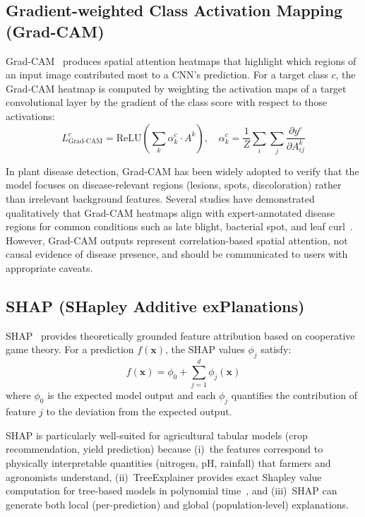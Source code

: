 \documentclass[journal]{IEEEtran}
\begin{document}
\subsection{Gradient-weighted Class Activation Mapping (Grad-CAM)}

Grad-CAM~\cite{selvaraju2017grad} produces spatial attention heatmaps that highlight which regions of an input image contributed most to a CNN's prediction. For a target class $c$, the Grad-CAM heatmap is computed by weighting the activation maps of a target convolutional layer by the gradient of the class score with respect to those activations:
\begin{equation}
  L_{\text{Grad-CAM}}^{c} = \text{ReLU}\!\left(\sum_{k} \alpha_{k}^{c} \cdot A^{k}\right), \quad
  \alpha_{k}^{c} = \frac{1}{Z} \sum_{i} \sum_{j} \frac{\partial y^{c}}{\partial A_{ij}^{k}}
\end{equation}

In plant disease detection, Grad-CAM has been widely adopted to verify that the model focuses on disease-relevant regions (lesions, spots, discoloration) rather than irrelevant background features. Several studies have demonstrated qualitatively that Grad-CAM heatmaps align with expert-annotated disease regions for common conditions such as late blight, bacterial spot, and leaf curl~\cite{saleem2019plant,thangaraj2021classification}. However, Grad-CAM outputs represent correlation-based spatial attention, not causal evidence of disease presence, and should be communicated to users with appropriate caveats.

\subsection{SHAP (SHapley Additive exPlanations)}

SHAP~\cite{lundberg2017unified,lundberg2020local2global} provides theoretically grounded feature attribution based on cooperative game theory. For a prediction $f(\mathbf{x})$, the SHAP values $\phi_j$ satisfy:
\begin{equation}
  f(\mathbf{x}) = \phi_0 + \sum_{j=1}^{d} \phi_j(\mathbf{x})
\end{equation}
where $\phi_0$ is the expected model output and each $\phi_j$ quantifies the contribution of feature $j$ to the deviation from the expected output.

SHAP is particularly well-suited for agricultural tabular models (crop recommendation, yield prediction) because (i)~the features correspond to physically interpretable quantities (nitrogen, pH, rainfall) that farmers and agronomists understand, (ii)~TreeExplainer provides exact Shapley value computation for tree-based models in polynomial time~\cite{lundberg2020local2global}, and (iii)~SHAP can generate both local (per-prediction) and global (population-level) explanations.
\end{document}
